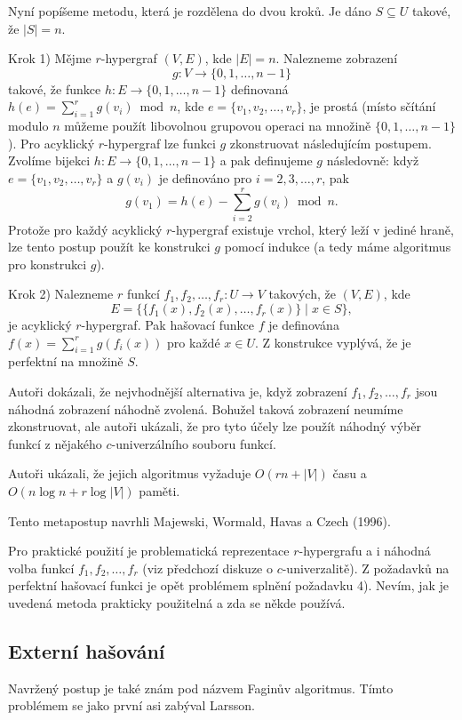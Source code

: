 \documentclass[a4paper,12pt]{article}
\begin{document}
Nyní popíšeme metodu, která je rozdělena do 
dvou kroků. Je dáno $S\subseteq U$ takové, že 
$|S|=n$.

Krok 1) Mějme $r$-hypergraf $(V,E)$, kde $|E|=n$.  Nalezneme 
zobrazení 
$$g:V\to \{0,1,\dots,n-1\}$$
takové, že funkce 
$h:E\to \{0,1,\dots,n-1\}$ definovaná $h(e)=\sum_{i=1}^rg(v_i)\bmod 
n$, 
kde $e=\{v_1,v_2,\dots,v_r\}$, je prostá (místo sčítání modulo $
n$ 
můžeme použít libovolnou grupovou operaci na 
množině $\{0,1,\dots,n-1\}$).  Pro acyklický $r$-hypergraf lze 
funkci $g$ zkonstruovat násle\-dujícím postupem.  Zvolíme 
bijekci $h:E\to \{0,1,\dots,n-1\}$ a pak definujeme $g$ 
následovně:  když $e=\{v_1,v_2,\dots,v_r\}$ a $g(v_i)$ je 
definováno pro $i=2,3,\dots,r$, pak 
$$g(v_1)=h(e)-\sum_{i=2}^rg(v_i)\bmod n.$$
Protože pro každý acyklický $r$-hypergraf existuje vrchol, který 
leží v jediné hraně, lze tento postup použít ke konstrukci $
g$ 
pomocí indukce (a tedy máme algoritmus pro konstrukci $g$).  

Krok 2) Nalezneme $r$ funkcí $f_1,f_2,\dots,f_r:U\to 
V$ takových, že 
$(V,E)$, kde 
$$E=\{\{f_1(x),f_2(x),\dots,f_r(x)\}\mid x\in S\},$$
 je acyklický 
$r$-hypergraf.  Pak hašovací funkce $f$ je definována 
$f(x)=\sum_{i=1}^rg(f_i(x))$ pro každé $x\in U$.  Z konstrukce 
vyplývá, že je perfektní na množině $S$.  

Autoři dokázali, že 
nejvhodnější alternativa je, když zobrazení $f_1
,f_2,\dots,f_r$ 
jsou náhodná zob\-razení náhodně zvolená. Bohu\-žel taková 
zobrazení neumíme zkonstruovat, ale autoři ukázali, že 
pro tyto účely lze použít náhodný výběr funkcí z 
nějakého $c$-univerzálního souboru funk\-cí. 

Autoři ukázali, že jejich algoritmus vyžaduje $
O(rn+|V|)$ 
času a $O(n\log n+r\log|V|)$ paměti. 

Tento metapostup navrhli Majewski, Wormald, Havas a Czech (1996).

Pro praktické použití je problematická 
reprezentace $r$-hyper\-gra\-fu a i náhodná volba funkcí 
$f_1,f_2,\dots,f_r$ (viz předchozí diskuze o $c$-univerzalitě).  Z 
požadavků na perfektní hašovací funkci je opět 
problémem splnění poža\-davku 4).  Nevím, jak je uvedená 
metoda prakticky pou\-ži\-telná a zda se někde používá.  

\subsection{Externí hašování}

Navržený postup je také znám pod názvem Faginův algoritmus. Tímto problémem se jako první asi zabýval Larsson.
\end{document}
